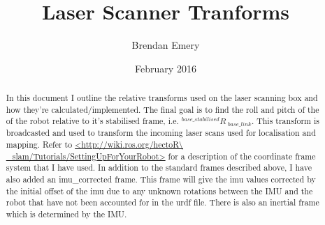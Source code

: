 \documentclass{article}
\title{Laser Scanner Tranforms}
\author{Brendan Emery}
\date{February 2016}
\begin{document}
\maketitle

\begin{abstract}
\noindent In this document I outline the relative transforms used on the laser scanning box and how they're calculated/implemented. The final goal is to find the roll and pitch of the of the robot relative to it's stabilised frame, i.e. $ {^{base\_stabilised}R\ _{base\_link}} $. This transform is broadcasted and used to transform the incoming laser scans used for localisation and mapping. Refer to \url{<http://wiki.ros.org/hectoR\ _slam/Tutorials/SettingUpForYourRobot>} for a description of the coordinate frame system that I have used. In addition to the standard frames described above, I have also added an imu\_corrected frame. This frame will give the imu values corrected by the initial offset of the imu due to any unknown rotations between the IMU and the robot that have not been accounted for in the urdf file. There is also an inertial frame which is determined by the IMU.
\end{abstract}

\vspace*{1cm}

\noindent
{}
%

\vspace*{0cm}

\end{document}
